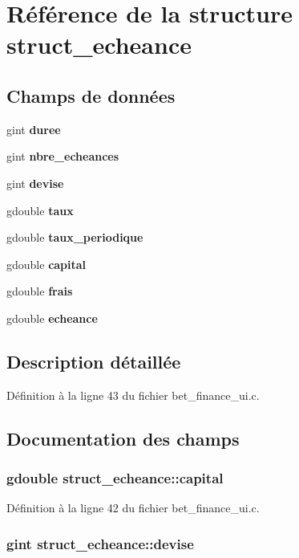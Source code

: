 \section{Référence de la structure struct\_\-echeance}
\label{structstruct__echeance}
\subsection*{Champs de données}
\begin{DoxyCompactItemize}
\item 
gint {\bf duree}
\item 
gint {\bf nbre\_\-echeances}
\item 
gint {\bf devise}
\item 
gdouble {\bf taux}
\item 
gdouble {\bf taux\_\-periodique}
\item 
gdouble {\bf capital}
\item 
gdouble {\bf frais}
\item 
gdouble {\bf echeance}
\end{DoxyCompactItemize}


\subsection{Description détaillée}


Définition à la ligne 43 du fichier bet\_\-finance\_\-ui.c.



\subsection{Documentation des champs}
\subsubsection[{capital}]{\setlength{\rightskip}{0pt plus 5cm}gdouble {\bf struct\_\-echeance::capital}}\label{structstruct__echeance_a4f80e2533248be97570cb808e3fd8f33}


Définition à la ligne 42 du fichier bet\_\-finance\_\-ui.c.

\subsubsection[{devise}]{\setlength{\rightskip}{0pt plus 5cm}gint {\bf struct\_\-echeance::devise}}\label{structstruct__echeance_a376a06e0bf18c6ddda5c4bb1d64f149d}


